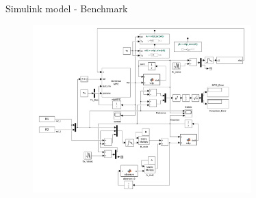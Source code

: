 \documentclass{beamer}
\begin{document}
\begin{frame}{Simulink model - Benchmark}
    \begin{figure}
        \centering
        \includegraphics[width=0.75\textwidth]{Simulink_KK.png}
    \end{figure}
\end{frame}
\end{document}
